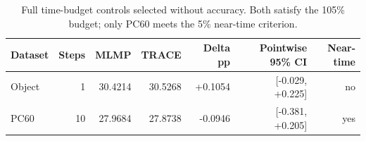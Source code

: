 \begin{table}[htbp]
\centering\scriptsize
\caption{Full time-budget controls selected without accuracy. Both satisfy the 105\% budget; only PC60 meets the 5\% near-time criterion.}
\label{tab:time}
\setlength{\tabcolsep}{4pt}
\begin{tabular}{lrrrrrr}
\toprule
Dataset & Steps & MLMP & TRACE & Delta pp & Pointwise 95\% CI & Near-time \\
\midrule
Object & 1 & 30.4214 & 30.5268 & +0.1054 & [-0.029, +0.225] & no \\
PC60 & 10 & 27.9684 & 27.8738 & -0.0946 & [-0.381, +0.205] & yes \\
\bottomrule
\end{tabular}
\end{table}
